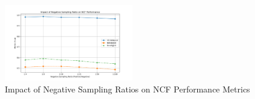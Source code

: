 \documentclass[runningheads]{llncs}
\begin{document}
\begin{figure}[h!]
    \centering
    \includegraphics[width=0.5\textwidth]{negative_sampling_ablation.png}
    \caption{Impact of Negative Sampling Ratios on NCF Performance Metrics}
    \label{fig:negative_sampling}
\end{figure}
\end{document}

